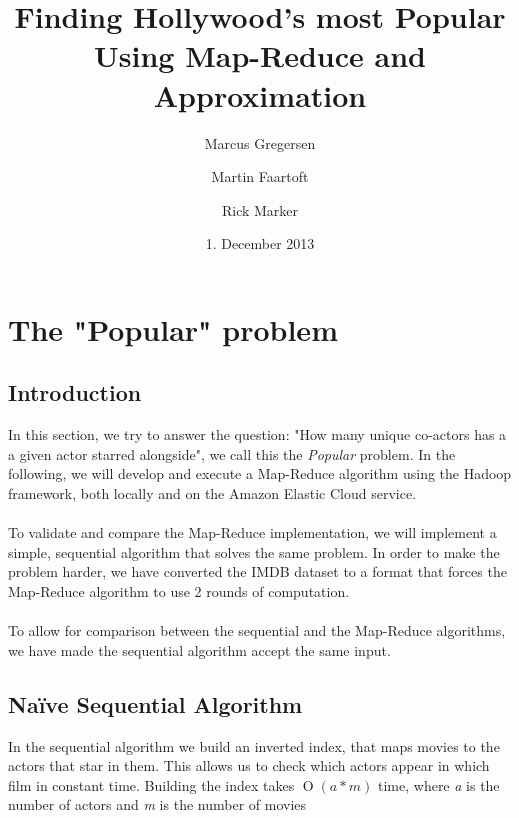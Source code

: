\documentclass[a4paper,11pt]{article}
\newcommand{\BigO}[1]{\ensuremath{\operatorname{O}\left(#1\right)}}
\begin{document}
\date{1. December 2013}
\title{Finding Hollywood's most Popular\\Using Map-Reduce and Approximation}

\author{Marcus Gregersen\and Martin Faartoft\and Rick Marker}
\clearpage\maketitle
\thispagestyle{empty}
\setcounter{page}{1}
\section{The "Popular" problem}
\subsection{Introduction}
In this section, we try to answer the question: "How many unique co-actors has a a given actor starred alongside", we call this the \emph{Popular} problem. In the following, we will develop and execute a Map-Reduce algorithm using the Hadoop framework, both locally and on the Amazon Elastic Cloud service.
\paragraph{}
To validate and compare the Map-Reduce implementation, we will implement a simple, sequential algorithm that solves the same problem. In order to make the problem harder, we have converted the IMDB dataset to a format that forces the Map-Reduce algorithm to use 2 rounds of computation.
\paragraph{} 
To allow for comparison between the sequential and the Map-Reduce algorithms, we have made the sequential algorithm accept the same input.
\subsection{Naïve Sequential Algorithm}
\label{sub:sequential}
In the sequential algorithm we build an inverted index, that maps movies to the actors that star in them. This allows us to check which actors appear in which film in constant time. Building the index takes \BigO{a*m} time, where \emph{a} is the number of actors and \emph{m} is the number of movies\\
\end{document}
